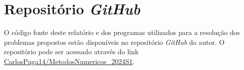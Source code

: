 \section{Reposit\'orio \textit{GitHub}}\label{sec:github}
O c\'odigo fonte deste relat\'orio e dos programas utilizados para a resolu\c{c}\~ao dos problemas propostos est\~ao dispon\'iveis no reposit\'orio \textit{GitHub} do autor. O reposit\'orio pode ser acessado atrav\'es do link \href{https://github.com/CarlosPuga14/MetodosNumericos_2024S1}{CarlosPuga14/MetodosNumericos\_2024S1}.